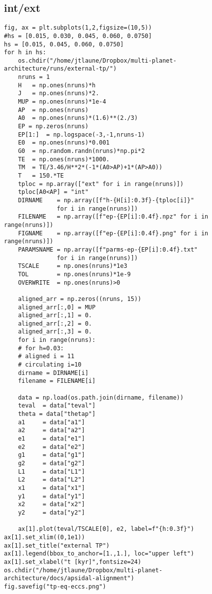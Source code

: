 \documentclass[11pt]{article}
\begin{document}
\subsection{int/ext}
\label{sec:org75d88cd}
\begin{verbatim}
fig, ax = plt.subplots(1,2,figsize=(10,5))
#hs = [0.015, 0.030, 0.045, 0.060, 0.0750]
hs = [0.015, 0.045, 0.060, 0.0750]
for h in hs:
    os.chdir("/home/jtlaune/Dropbox/multi-planet-architecture/runs/external-tp/")
    nruns = 1
    H   = np.ones(nruns)*h
    J   = np.ones(nruns)*2.
    MUP = np.ones(nruns)*1e-4
    AP  = np.ones(nruns)
    A0  = np.ones(nruns)*(1.6)**(2./3)
    EP = np.zeros(nruns)
    EP[1:]  = np.logspace(-3,-1,nruns-1)
    E0  = np.ones(nruns)*0.001
    G0  = np.random.randn(nruns)*np.pi*2
    TE  = np.ones(nruns)*1000.
    TM  = TE/3.46/H**2*(-1*(A0>AP)+1*(AP>A0))
    T   = 150.*TE
    tploc = np.array(["ext" for i in range(nruns)])
    tploc[A0<AP] = "int"
    DIRNAME    = np.array([f"h-{H[i]:0.3f}-{tploc[i]}"
			   for i in range(nruns)])
    FILENAME   = np.array([f"ep-{EP[i]:0.4f}.npz" for i in range(nruns)])
    FIGNAME    = np.array([f"ep-{EP[i]:0.4f}.png" for i in range(nruns)])
    PARAMSNAME = np.array([f"parms-ep-{EP[i]:0.4f}.txt"
			   for i in range(nruns)])
    TSCALE     = np.ones(nruns)*1e3
    TOL        = np.ones(nruns)*1e-9
    OVERWRITE  = np.ones(nruns)>0

    aligned_arr = np.zeros((nruns, 15))
    aligned_arr[:,0] = MUP
    aligned_arr[:,1] = 0.
    aligned_arr[:,2] = 0.
    aligned_arr[:,3] = 0.
    for i in range(nruns):
	# for h=0.03:
	# aligned i = 11
	# circulating i=10
	dirname = DIRNAME[i]
	filename = FILENAME[i]

	data = np.load(os.path.join(dirname, filename))
	teval  = data["teval"]
	theta = data["thetap"]
	a1     = data["a1"]
	a2     = data["a2"]
	e1     = data["e1"]
	e2     = data["e2"]
	g1     = data["g1"]
	g2     = data["g2"]
	L1     = data["L1"]
	L2     = data["L2"]
	x1     = data["x1"]
	y1     = data["y1"]
	x2     = data["x2"]
	y2     = data["y2"]

	ax[1].plot(teval/TSCALE[0], e2, label=f"{h:0.3f}")
ax[1].set_xlim((0,1e1))
ax[1].set_title("external TP")
ax[1].legend(bbox_to_anchor=[1.,1.], loc="upper left")
ax[1].set_xlabel("t [kyr]",fontsize=24)
os.chdir("/home/jtlaune/Dropbox/multi-planet-architecture/docs/apsidal-alignment")
fig.savefig("tp-eq-eccs.png")

\end{verbatim}
\end{document}
